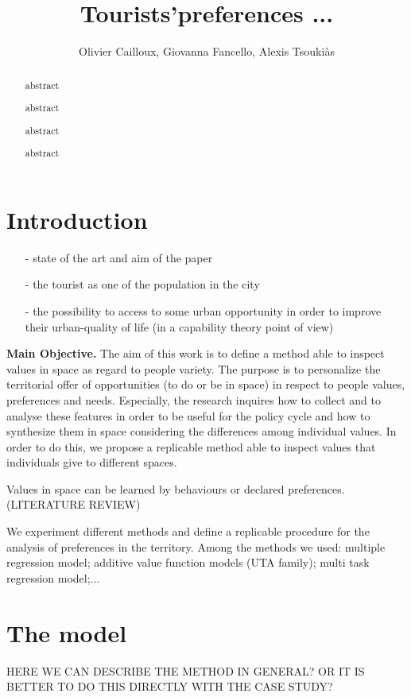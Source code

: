 \documentclass[a4paper]{article}
\author{Olivier Cailloux, Giovanna Fancello, Alexis Tsoukiàs}
\title{Tourists'preferences ...}
\begin{document}
\maketitle
\begin{abstract}
abstract

abstract

abstract

abstract
\end{abstract}

\tableofcontents

\section{Introduction}
\begin{itemize}
   \item [-]state of the art and aim of the paper
   \item [-]the tourist as one of the population in the city
   \item [-]the possibility to access to some urban opportunity in order to improve their urban-quality of life (in a capability theory point of view)
 \end{itemize}

\textbf{Main Objective.}
The aim of this work is to define a method able to inspect values in space as regard to people variety. The purpose is to personalize the territorial offer of opportunities (to do or be in space) in respect to people values, preferences and needs. Especially, the research inquires how to collect and to analyse these features in order to be useful for the policy cycle and how to synthesize them in space considering the differences among individual values. In order to do this, we propose a replicable method able to inspect values that individuals give to different spaces.

Values in space can be learned by behaviours or declared preferences.(LITERATURE REVIEW)

We experiment different methods and define a replicable procedure for the analysis of preferences in the territory. Among the methods we used: multiple regression model; additive value function models (UTA family); multi task regression model;...

\section{The model}
HERE WE CAN DESCRIBE THE METHOD IN GENERAL? OR IT IS BETTER TO DO THIS DIRECTLY WITH THE CASE STUDY?
\end{document}
